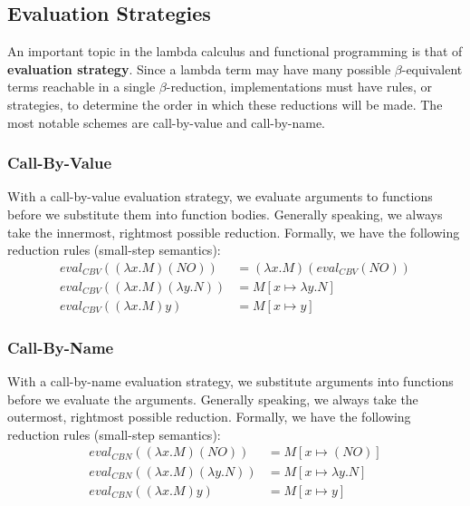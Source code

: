 \documentclass{article}
\begin{document}
\subsection{Evaluation Strategies}
An important topic in the lambda calculus and functional programming is that of \textbf{evaluation strategy}. Since a lambda term may have many possible $\beta$-equivalent terms reachable in a single $\beta$-reduction, implementations must have rules, or strategies, to determine the order in which these reductions will be made. The most notable schemes are call-by-value and call-by-name.

\subsubsection{Call-By-Value}
With a call-by-value evaluation strategy, we evaluate arguments to functions before we substitute them into function bodies. Generally speaking, we always take the innermost, rightmost possible reduction. Formally, we have the following reduction rules (small-step semantics):
\begin{align*}
            eval_{CBV} ( (\lambda x.M) (N O) ) &= (\lambda x.M) (eval_{CBV} (N O) ) \\
    eval_{CBV} ( (\lambda x.M) (\lambda y.N) ) &= M[x \mapsto \lambda y.N]          \\
              eval_{CBV} ( (\lambda x.M) y )   &= M[x \mapsto y]
\end{align*}
\subsubsection{Call-By-Name}
With a call-by-name evaluation strategy, we substitute arguments into functions before we evaluate the arguments. Generally speaking, we always take the outermost, rightmost possible reduction. Formally, we have the following reduction rules (small-step semantics):
\begin{align*}
            eval_{CBN} ( (\lambda x.M) (N O) ) &= M[x \mapsto (N O)]       \\
    eval_{CBN} ( (\lambda x.M) (\lambda y.N) ) &= M[x \mapsto \lambda y.N] \\
              eval_{CBN} ( (\lambda x.M) y )   &= M[x \mapsto y]
\end{align*}
\end{document}
